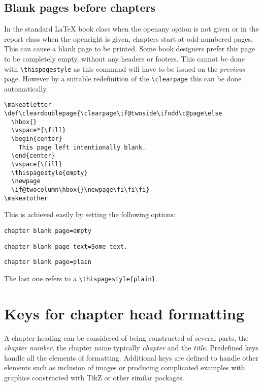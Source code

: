 \subsection{Blank pages before chapters}
In the standard LaTeX book class when the openany option is not given or in the report class when the openright is given, chapters start at odd-numbered pages. This can cause a blank page to be printed. Some book designers prefer this page to be completely empty, without any headers or footers. This cannot be done with \lstinline{\thispagestyle} as this command will have to be issued on the \textit{previous} page. However by a suitable redefinition of the
\lstinline{\clearpage} this can be done automatically.
\medskip

\begin{tcolorbox}
\begin{lstlisting}
\makeatletter
\def\cleardoublepage{\clearpage\if@twoside\ifodd\c@page\else
  \hbox{}
  \vspace*{\fill}
  \begin{center}
    This page left intentionally blank.
  \end{center}
  \vspace{\fill}
  \thispagestyle{empty}
  \newpage
  \if@twocolumn\hbox{}\newpage\fi\fi\fi}
\makeatother
\end{lstlisting}
\end{tcolorbox}
\medskip

This is achieved easily by setting the following options:
\bigskip

\begin{tcolorbox}
\lstinline{chapter blank page=empty}\par
\lstinline{chapter blank page text=Some text.}\par
\lstinline{chapter blank page=plain}\par
\end{tcolorbox}
\medskip



The last one refers to a \lstinline!\thispagestyle{plain}!.

\section{Keys for chapter head formatting}

A chapter heading can be considered of being constructed of several parts, the \textit{chapter number}, the chapter name typically \textit{chapter} and the \textit{title}. Predefined keys handle all the elements of formatting. Additional keys are defined to handle other elements such as inclusion of images or producing complicated examples with graphics constructed with TikZ or other similar packages.

